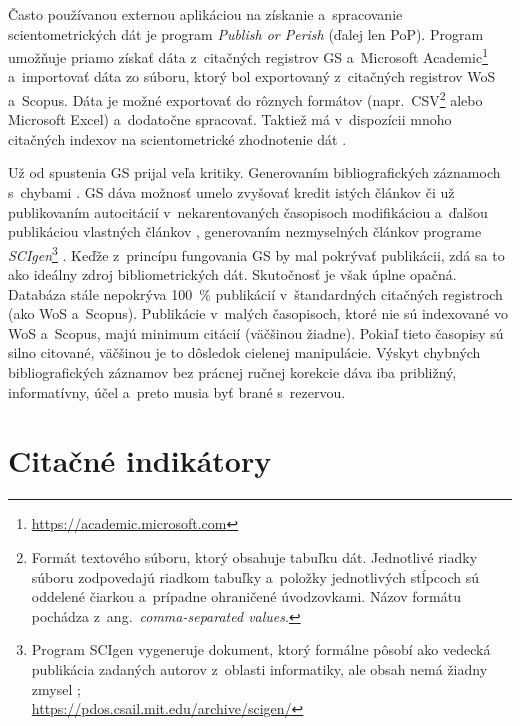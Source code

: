 Často používanou externou aplikáciou na získanie a~spracovanie scientometrických
dát je program \emph{Publish or Perish} (ďalej
len PoP).  Program umožňuje priamo získať dáta z~citačných registrov GS
a~Microsoft Academic\footnote{\url{https://academic.microsoft.com}} a~importovať
dáta zo súboru, ktorý bol exportovaný z~citačných registrov WoS a~Scopus.  Dáta
je možné exportovať do rôznych formátov (napr.~CSV\footnote{Formát textového
  súboru, ktorý obsahuje tabuľku dát.  Jednotlivé riadky súboru zodpovedajú
  riadkom tabuľky a~položky jednotlivých stĺpcoch sú oddelené čiarkou a~prípadne
  ohraničené úvodzovkami.  Názov formátu pochádza z~ang.~\emph{comma-separated
    values}.} alebo Microsoft Excel) a~dodatočne spracovať.  Taktiež má
v~dispozícii mnoho citačných indexov na scientometrické zhodnotenie dát
\citep{Harzing2011}.

Už od spustenia GS prijal veľa kritiky.  Generovaním bibliografických záznamoch
s~chybami \citep{Jacso2009,Jacso2010}.  GS dáva možnosť umelo zvyšovať kredit
istých článkov či už publikovaním autocitácií v~nekarentovaných časopisoch
modifikáciou a~ďalšou publikáciou vlastných článkov \citep{Beel2010b},
generovaním nezmyselných článkov programe
\emph{SCIgen}\footnote{Program SCIgen vygeneruje dokument,
  ktorý formálne pôsobí ako vedecká publikácia zadaných autorov z~oblasti
  informatiky, ale obsah nemá žiadny zmysel
  \citep{Labbe2013};\\\url{https://pdos.csail.mit.edu/archive/scigen/}}
\citep{Beel2010a}.  Keďže z~princípu fungovania GS by mal pokrývať publikácii,
zdá sa to ako ideálny zdroj bibliometrických dát.  Skutočnosť je však úplne
opačná.  Databáza stále nepokrýva 100~\% publikácií v~štandardných citačných
registroch (ako WoS a~Scopus).  Publikácie v~malých časopisoch, ktoré nie sú
indexované vo WoS a~Scopus, majú minimum citácií (väčšinou žiadne).  Pokiaľ
tieto časopisy sú silno citované, väčšinou je to dôsledok cielenej manipulácie.
Výskyt chybných bibliografických záznamov bez prácnej ručnej korekcie dáva iba
približný, informatívny, účel a~preto musia byť brané s~rezervou.


\section{Citačné indikátory}
\label{sec:indicators}

